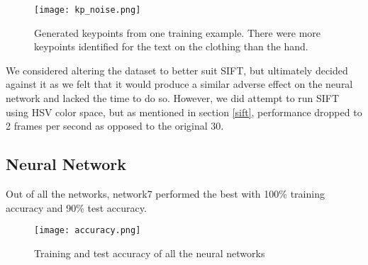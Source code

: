 \begin{figure}[h]
\texttt{[image: kp\_noise.png]}
\centering
\caption{Generated keypoints from one training example. There were more keypoints identified for the text on the clothing than the hand.}
\label{kp_noise}
\end{figure}

We considered altering the dataset to better suit SIFT, but ultimately decided against it as we felt that it would produce a similar adverse effect on the neural network and lacked the time to do so. However, we did attempt to run SIFT using HSV color space, but as mentioned in section \ref{sift}, performance dropped to 2 frames per second as opposed to the original 30.

\subsection{Neural Network}
Out of all the networks, network7 performed the best with 100\% training accuracy and 90\% test accuracy.

\begin{figure}[h]
\texttt{[image: accuracy.png]}
\centering
\caption{Training and test accuracy of all the neural networks}
\end{figure}